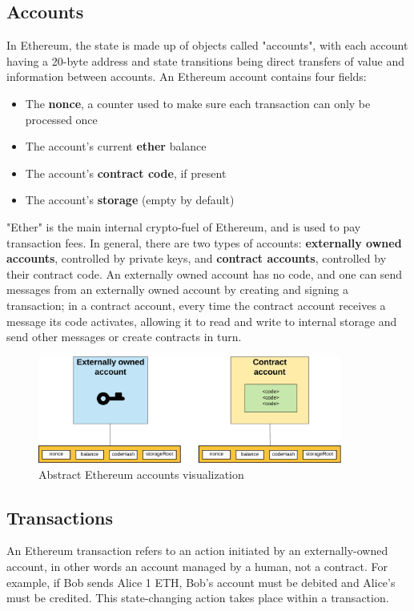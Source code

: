 \subsection{Accounts}
In Ethereum, the state is made up of objects called "accounts", with each account having a 20-byte address and state transitions being direct transfers of value and information between accounts. An Ethereum account contains four fields:

\begin{itemize}
\item The \textbf{nonce}, a counter used to make sure each transaction can only be processed once
\item The account's current \textbf{ether} balance
\item The account's \textbf{contract code}, if present
\item The account's \textbf{storage} (empty by default)
\end{itemize}

"Ether" is the main internal crypto-fuel of Ethereum, and is used to pay transaction fees. In general, there are two types of accounts: \textbf{externally owned accounts}, controlled by private keys, and \textbf{contract accounts}, controlled by their contract code. An externally owned account has no code, and one can send messages from an externally owned account by creating and signing a transaction; in a contract account, every time the contract account receives a message its code activates, allowing it to read and write to internal storage and send other messages or create contracts in turn.\newpage

\begin{figure}[h]
	\centering
		\includegraphics[width=10cm]{images/chapter2/accounts.png}
		\caption{{\footnotesize Abstract Ethereum accounts visualization}}
\end{figure}

\subsection{Transactions}
An Ethereum transaction refers to an action initiated by an externally-owned account, in other words an account managed by a human, not a contract. For example, if Bob sends Alice 1 ETH, Bob's account must be debited and Alice's must be credited. This state-changing action takes place within a transaction.


